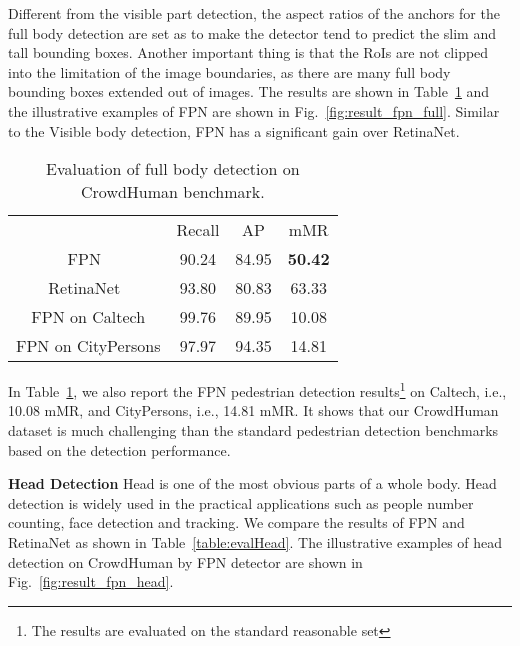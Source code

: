 \documentclass[10pt,twocolumn,letterpaper]{article}
\newcommand{\myparagraph}[1]{{\vspace{0.5em} \noindent \bf #1}}
\begin{document}
Different from the visible part detection, the aspect ratios of the anchors for the full body detection are set as  to make the detector tend to predict the slim and tall bounding boxes. Another important thing is that the RoIs are not clipped into the limitation of the image boundaries, as there are many full body bounding boxes extended out of images. The results are shown in Table~\ref{table:evalfull} and the illustrative examples of FPN are shown in Fig.~\ref{fig:result_fpn_full}. Similar to the Visible body detection, FPN has a significant gain over RetinaNet. 


\setlength{\tabcolsep}{4pt}
\begin{table}
\begin{center}
\caption{Evaluation of full body detection on CrowdHuman benchmark.}
\label{table:evalfull}
\begin{tabular}{cccc}
\hline\noalign{\smallskip}
{} & Recall & AP & mMR\\
\noalign{\smallskip}
\hline
\noalign{\smallskip}
FPN~\cite{lin2017feature} & {90.24} & {84.95} & {\textbf{50.42}}\\
RetinaNet~\cite{lin2017focal} & {93.80} & {80.83} & {63.33}\\
\hline
\hline
FPN on Caltech & {99.76}  & {89.95} & {10.08}\\
FPN on CityPersons & {97.97} & {94.35} & {14.81}\\
\hline
\end{tabular}
\end{center}
\end{table}
\setlength{\tabcolsep}{1.4pt}

In Table~\ref{table:evalfull}, we also report the FPN pedestrian detection results\footnote{The results are evaluated on the standard reasonable set} on Caltech, i.e., 10.08 mMR, and CityPersons, i.e., 14.81 mMR. It shows that our CrowdHuman dataset is much challenging than the standard pedestrian detection benchmarks based on the detection performance.


\myparagraph{Head Detection} Head is one of the most obvious parts of a whole body. Head detection is widely used in the practical applications such as people number counting, face detection and tracking. We compare the results of FPN and RetinaNet as shown in Table~\ref{table:evalHead}. The illustrative examples of head detection on CrowdHuman by FPN detector are shown in Fig.~\ref{fig:result_fpn_head}.
\end{document}
